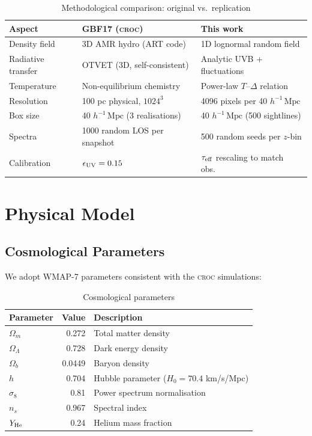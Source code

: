 \documentclass[11pt]{article}
\newcommand{\Mpch}{h^{-1}\,\text{Mpc}}
\newcommand{\taueff}{\tau_{\rm eff}}
\newcommand{\croc}{\textsc{croc}}
\begin{document}
\begin{table}[H]
\centering
\caption{Methodological comparison: original vs.\ replication}
\label{tab:method}
\small
\begin{tabular}{@{}lll@{}}
\toprule
\textbf{Aspect} & \textbf{GBF17 (\croc)} & \textbf{This work} \\
\midrule
Density field & 3D AMR hydro (ART code) & 1D lognormal random field \\
Radiative transfer & OTVET (3D, self-consistent) & Analytic UVB + fluctuations \\
Temperature & Non-equilibrium chemistry & Power-law $T$--$\Delta$ relation \\
Resolution & 100 pc physical, $1024^3$ & 4096 pixels per 40 $\Mpch$ \\
Box size & 40 $\Mpch$ (3 realisations) & 40 $\Mpch$ (500 sightlines) \\
Spectra & 1000 random LOS per snapshot & 500 random seeds per $z$-bin \\
Calibration & $\epsilon_{\rm UV} = 0.15$ & $\taueff$ rescaling to match obs.\ \\
\bottomrule
\end{tabular}
\end{table}

\section{Physical Model}

\subsection{Cosmological Parameters}

We adopt WMAP-7 parameters consistent with the \croc{} simulations:

\begin{table}[H]
\centering
\caption{Cosmological parameters}
\label{tab:cosmo}
\begin{tabular}{@{}lrl@{}}
\toprule
\textbf{Parameter} & \textbf{Value} & \textbf{Description} \\
\midrule
$\Omega_m$      & 0.272 & Total matter density \\
$\Omega_\Lambda$ & 0.728 & Dark energy density \\
$\Omega_b$      & 0.0449 & Baryon density \\
$h$             & 0.704 & Hubble parameter ($H_0 = 70.4$ km/s/Mpc) \\
$\sigma_8$      & 0.81 & Power spectrum normalisation \\
$n_s$           & 0.967 & Spectral index \\
$Y_{\rm He}$    & 0.24 & Helium mass fraction \\
\bottomrule
\end{tabular}
\end{table}
\end{document}
